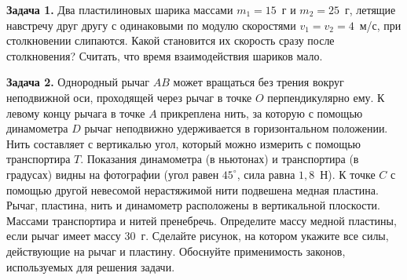 \begin{taskbasic}[code={\label{task:mechanics_v3_n22}}]
\textbf{Задача 1.} Два пластилиновых шарика массами $m_1 = 15$~г и $m_2 = 25$~г, летящие навстречу друг другу с одинаковыми по модулю скоростями $v_1 = v_2 = 4$~м/с, при столкновении слипаются. Какой становится их скорость сразу после столкновения? Считать, что время взаимодействия шариков мало.

\end{taskbasic}

\begin{taskbasic}[code={\label{task:mechanics_v3_n26}}]
\textbf{Задача 2.} Однородный рычаг $AB$ может вращаться без трения вокруг неподвижной оси, проходящей через рычаг в точке $O$ перпендикулярно ему. К левому концу рычага в точке $A$ прикреплена нить, за которую с помощью динамометра $D$ рычаг неподвижно удерживается в горизонтальном положении. Нить составляет с вертикалью угол, который можно измерить с помощью транспортира $T$. Показания динамометра (в ньютонах) и транспортира (в градусах) видны на фотографии (угол равен $45^{\circ}$, сила равна $1{,}8$~Н). К точке $C$ с помощью другой невесомой нерастяжимой нити подвешена медная пластина. Рычаг, пластина, нить и динамометр расположены в вертикальной плоскости. Массами транспортира и нитей пренебречь. Определите массу медной пластины, если рычаг имеет массу $30$~г. Сделайте рисунок, на котором укажите все силы, действующие на рычаг и пластину. Обоснуйте применимость законов, используемых для решения задачи.

\nopagebreak\smallskip
\begin{center}
\end{center}
\end{taskbasic}
